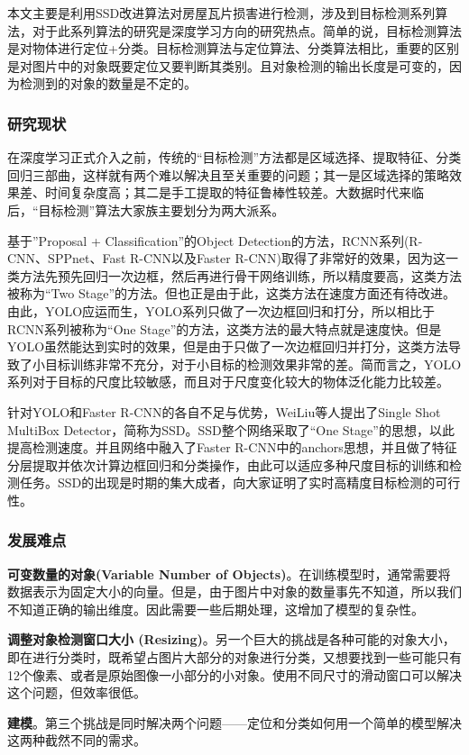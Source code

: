 本文主要是利用SSD改进算法对房屋瓦片损害进行检测，涉及到目标检测系列算法，对于此系列算法的研究是深度学习方向的研究热点。简单的说，目标检测算法是对物体进行定位+分类。目标检测算法与定位算法、分类算法相比，重要的区别是对图片中的对象既要定位又要判断其类别。且对象检测的输出长度是可变的，因为检测到的对象的数量是不定的。

\subsubsection{研究现状}
在深度学习正式介入之前，传统的“目标检测”方法都是区域选择、提取特征、分类回归三部曲\cite{hkq}，这样就有两个难以解决且至关重要的问题；其一是区域选择的策略效果差、时间复杂度高；其二是手工提取的特征鲁棒性较差。大数据时代来临后，“目标检测”算法大家族主要划分为两大派系。

基于”Proposal + Classification”的Object Detection的方法，RCNN系列(R-CNN\cite{rcnn}、SPPnet\cite{sppnet}、Fast R-CNN\cite{fastrcnn}以及Faster R-CNN\cite{fasterrcnn})取得了非常好的效果，因为这一类方法先预先回归一次边框，然后再进行骨干网络训练，所以精度要高，这类方法被称为“Two Stage”的方法。但也正是由于此，这类方法在速度方面还有待改进。由此，YOLO\cite{yolo}应运而生，YOLO系列只做了一次边框回归和打分，所以相比于RCNN系列被称为“One Stage”的方法，这类方法的最大特点就是速度快。但是YOLO虽然能达到实时的效果，但是由于只做了一次边框回归并打分，这类方法导致了小目标训练非常不充分，对于小目标的检测效果非常的差。简而言之，YOLO系列对于目标的尺度比较敏感，而且对于尺度变化较大的物体泛化能力比较差。

针对YOLO和Faster R-CNN的各自不足与优势，WeiLiu等人提出了Single Shot MultiBox Detector，简称为SSD。SSD整个网络采取了“One Stage”的思想，以此提高检测速度。并且网络中融入了Faster R-CNN\cite{fasterrcnn}中的anchors思想，并且做了特征分层提取并依次计算边框回归和分类操作，由此可以适应多种尺度目标的训练和检测任务。SSD的出现是时期的集大成者，向大家证明了实时高精度目标检测的可行性。

\subsubsection{发展难点}
\textbf{可变数量的对象(Variable Number of Objects)}。在训练模型时，通常需要将数据表示为固定大小的向量。但是，由于图片中对象的数量事先不知道，所以我们不知道正确的输出维度。因此需要一些后期处理，这增加了模型的复杂性。

\textbf{调整对象检测窗口大小 (Resizing)}。另一个巨大的挑战是各种可能的对象大小，即在进行分类时，既希望占图片大部分的对象进行分类，又想要找到一些可能只有12个像素、或者是原始图像一小部分的小对象。使用不同尺寸的滑动窗口可以解决这个问题，但效率很低。

\textbf{建模}。第三个挑战是同时解决两个问题——定位和分类如何用一个简单的模型解决这两种截然不同的需求。
